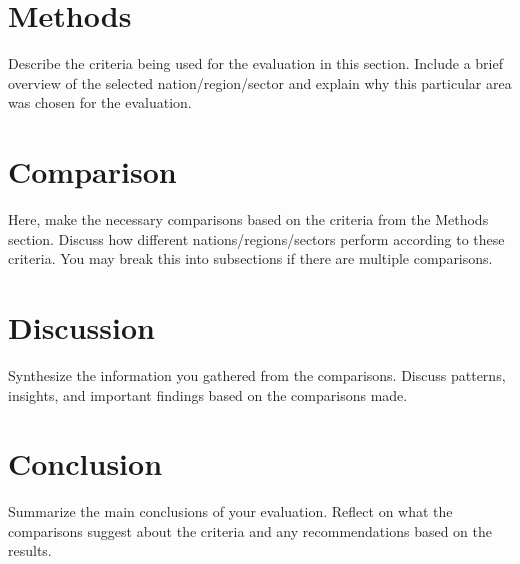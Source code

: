 \documentclass[12pt]{article}
\begin{document}
\section*{Methods}
Describe the criteria being used for the evaluation in this section. Include a brief overview of the selected nation/region/sector and explain why this particular area was chosen for the evaluation.

\section*{Comparison}
Here, make the necessary comparisons based on the criteria from the Methods section. Discuss how different nations/regions/sectors perform according to these criteria. You may break this into subsections if there are multiple comparisons.

\section*{Discussion}
Synthesize the information you gathered from the comparisons. Discuss patterns, insights, and important findings based on the comparisons made.

\section*{Conclusion}
Summarize the main conclusions of your evaluation. Reflect on what the comparisons suggest about the criteria and any recommendations based on the results.

\newpage
\printbibliography
\end{document}
